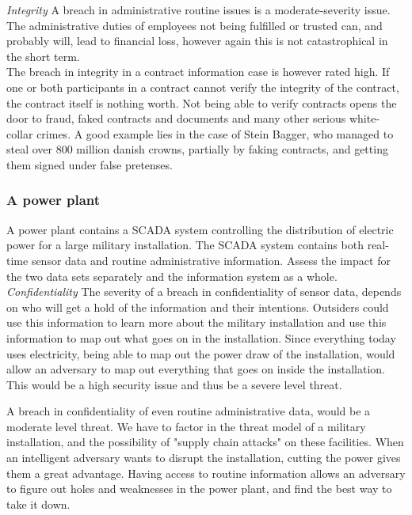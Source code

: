 \documentclass{article}
\begin{document}
\emph{Integrity}
A breach in administrative routine issues is a moderate-severity issue. The administrative
duties of employees not being fulfilled or trusted can, and probably will, lead to financial
loss, however again this is not catastrophical in the short term.\\
The breach in integrity in a contract information case is however rated high. If one or
both participants in a contract cannot verify the integrity of the contract, the contract
itself is nothing worth. Not being able to verify contracts opens the door to fraud, faked
contracts and documents and many other serious white-collar crimes. A good example lies in
the case of Stein Bagger, who managed to steal over 800 million danish crowns, partially
by faking contracts, and getting them signed under false pretenses.

\subsubsection{A power plant}
A power plant contains a SCADA system controlling the distribution of electric power for a 
large military installation. The SCADA system contains both real-time sensor data and 
routine administrative information. Assess the impact for the two data sets separately
and the information system as a whole.\\

\emph{Confidentiality} 
The severity of a breach in confidentiality of sensor data, depends on who will get a hold of
the information and their intentions. Outsiders could use this information to learn
more about the military installation and use this information to map out what goes on in
the installation. Since everything today uses electricity, being able to map out the power
draw of the installation, would allow an adversary to map out everything that goes on inside
the installation.
This would be a high security issue and thus be a severe level threat. 

A breach in confidentiality of even routine administrative data, would be a moderate
level threat. We have to factor in the threat model of a military installation, and the
possibility of "supply chain attacks" on these facilities. When an intelligent adversary
wants to disrupt the installation, cutting the power gives them a great advantage. Having
access to routine information allows an adversary to figure out holes and weaknesses in 
the power plant, and find the best way to take it down.\\
\end{document}
